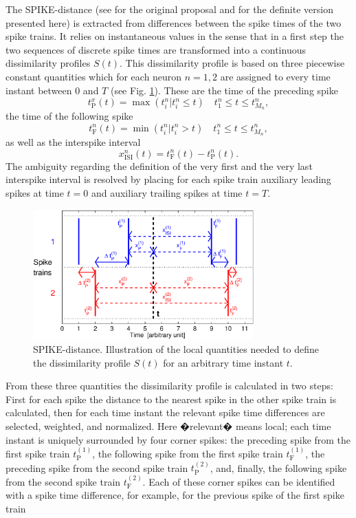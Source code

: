 \documentclass[10pt,twocolumn]{elsart5p}
\begin{document}
The SPIKE-distance (see \citet{Kreuz11} for the original proposal and \citet{Kreuz13} for the definite version presented here) is extracted from differences between the spike times of the two spike trains. It relies on instantaneous values in the sense that in a first step the two sequences of discrete spike times are transformed into a continuous dissimilarity profiles $S (t)$. This dissimilarity profile is based on three piecewise constant quantities which for each neuron $n = 1, 2$ are assigned to every time instant between $0$ and $T$ (see Fig. \ref{fig:Fig1-SPIKE-Illustration}). These are the time of the preceding spike
%
\begin{equation} \label{eq:Prev-Spike}
    t_{\mathrm {P}}^x (t) = \max(t_i^n | t_i^n \leq t)  \quad t_1^n \leq t \leq t_{M_n}^n,
\end{equation}
%
the time of the following spike
%
\begin{equation} \label{eq:Foll-Spike}
    t_{\mathrm {F}}^n (t) = \min(t_i^n | t_i^n > t)  \quad t_1^n \leq t \leq t_{M_n}^n,
\end{equation}
%
as well as the interspike interval
%
\begin{equation} \label{eq:ISI}
    x_{\mathrm {ISI}}^n (t) = t_{\mathrm {F}}^n (t) - t_{\mathrm {P}}^n (t).
\end{equation}
%
The ambiguity regarding the definition of the very first and the very last interspike interval is resolved by placing for each spike train auxiliary leading spikes at time $t = 0$ and auxiliary trailing spikes at time $t = T$.
%
\begin{figure}
    \includegraphics[width=85mm]{Fig1_SPIKE_Illustration.eps}
    \caption{\abb\label{fig:Fig1-SPIKE-Illustration} SPIKE-distance. Illustration of the local quantities needed to define the dissimilarity profile $S (t)$ for an arbitrary time instant $t$.}
\end{figure}
%
From these three quantities the dissimilarity profile is calculated in two steps: First for each spike the distance to the nearest spike in the other spike train is calculated, then for each time instant the relevant spike time differences are selected, weighted, and normalized. Here �relevant� means local; each time instant is uniquely surrounded by four corner spikes: the preceding spike from the first spike train $t_{\mathrm {P}}^{(1)}$, the following spike from the first spike train $t_{\mathrm {F}}^{(1)}$, the preceding spike from the second spike train $t_{\mathrm {P}}^{(2)}$, and, finally, the following spike from the second spike train $t_{\mathrm {F}}^{(2)}$. Each of these corner spikes can be identified with a spike time difference, for example, for the previous spike of the first spike train
\end{document}

